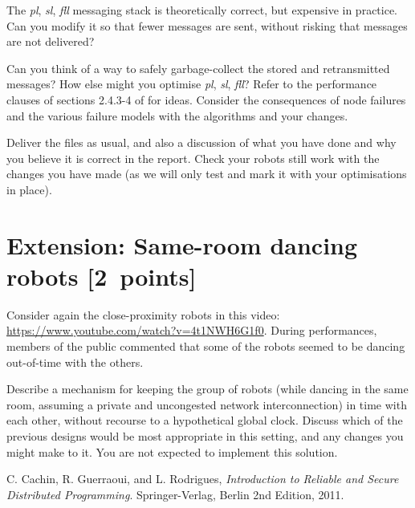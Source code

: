 \documentclass[a4paper]{article}
\begin{document}
The \emph{pl}, \emph{sl}, \emph{fll} messaging stack is theoretically correct,
but expensive in practice. Can you modify it so that fewer messages are sent,
without risking that messages are not delivered?

Can you think of a way to safely garbage-collect the stored and retransmitted
messages? How else might you optimise \emph{pl}, \emph{sl}, \emph{fll}? Refer to the
performance clauses of sections 2.4.3-4 of \cite{cachin2011} for ideas.
Consider the consequences of node failures and the various failure models
with the algorithms and your changes.

Deliver the files as usual, and also a discussion of what you have done and
why you believe it is correct in the report. Check your robots still work
with the changes you have made (as we will only test and mark it with your
optimisations in place).







\section*{Extension: Same-room dancing robots [2~points]} %
\label{sec:extension_same_room_dancing_robots}

Consider again the close-proximity robots in this video:
\url{https://www.youtube.com/watch?v=4t1NWH6G1f0}. During performances,
members of the public commented that some of the robots seemed to be dancing
out-of-time with the others.

Describe a mechanism for keeping the group of
robots (while dancing in the same room, assuming a private and uncongested
network interconnection) in time with each other, without recourse to a
hypothetical global clock. Discuss which of the previous designs would be most
appropriate in this setting, and any changes you might make to it.
You are not expected to implement this solution.



















\begin{thebibliography}{9}

  C. Cachin, R. Guerraoui, and L. Rodrigues,
  \emph{Introduction to Reliable and Secure Distributed Programming}.
  Springer-Verlag, Berlin
  2nd Edition,
  2011.

\end{thebibliography}
\end{document}

